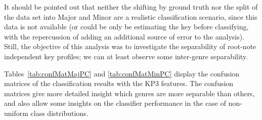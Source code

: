 \documentclass{article}
\begin{document}
It should be pointed out that neither the shifting by ground truth nor the split of the data set into Major and Minor are a realistic classification scenario, since this data is not available (or could be only be estimating the key before classifying, with the repercussion of adding an additional source of error to the analysis). 
Still, the objective of this analysis was to investigate the separability of root-note independent key profiles; we can at least observe some inter-genre separability.



Tables~\ref{tab:confMatMajPC} and \ref{tab:confMatMinPC} display the confusion matrices of the classification results with the KP3 features. The confusion matrices give more detailed insight which genres are more separable than others, and also allow some insights on the classifier performance in the case of non-uniform class distributions.


\end{document}
